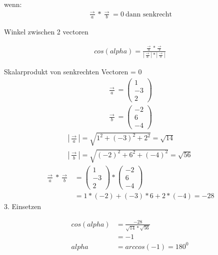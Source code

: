 wenn:\\
\begin{align*}
  \frac{\rightarrow}{a} * \frac{\rightarrow}{b} = 0 \ \text{dann senkrecht}
\end{align*}

Winkel zwischen 2 vectoren

\begin{align*}
  cos(alpha) = \frac{\frac{\rightarrow}{a} * \frac{\rightarrow}{b} }{|\frac{\rightarrow}{a}| * |\frac{\rightarrow}{b}|}
\end{align*}

Skalarprodukt von senkrechten Vectoren = 0 \\

\begin{align*}
  \frac{\rightarrow}{a} = \left(
   \begin{array}{c}
     1 \\
     -3 \\
     2
   \end{array}
\right)
\end{align*}
\begin{align*}
  \frac{\rightarrow}{b} = \left(
   \begin{array}{c}
     -2 \\
     6 \\
     -4
   \end{array}
\right)
\end{align*}
\begin{align*}
  |\frac{\rightarrow}{a}| = \sqrt{1^2 + (-3)^2 +2^2} = \sqrt{14} \\
  |\frac{\rightarrow}{b}| = \sqrt{(-2)^2 + 6^2 +(-4)^2} = \sqrt{56}
\end{align*}
\begin{align*}
  \frac{\rightarrow}{a} * \frac{\rightarrow}{b} &= \left(
   \begin{array}{c}
     1 \\
     -3 \\
     2
   \end{array}
\right) * \left(
 \begin{array}{c}
   -2 \\
   6 \\
   -4
 \end{array}
\right) \\
&= 1*(-2)+(-3)*6+2*(-4) = -28
\end{align*}
3. Einsetzen

\begin{align*}
  cos(alpha) &= \frac{-28}{\sqrt{14} * \sqrt{56}}\\
  &= -1 \\
  alpha &= arccos(-1) = 180^0
\end{align*}

